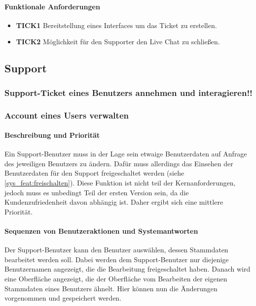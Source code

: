 \paragraph{Funktionale Anforderungen}
\begin{itemize}
\item \textbf{TICK1} Bereitstellung eines Interfaces um das Ticket zu erstellen.
\item \textbf{TICK2} Möglichkeit für den Supporter den Live Chat zu schließen.
\end{itemize}


\subsection{Support}
\subsubsection{Support-Ticket eines Benutzers annehmen und interagieren!!}

\subsubsection{Account eines Users verwalten}
\paragraph{Beschreibung und Priorität}
Ein Support-Benutzer muss in der Lage sein etwaige Benutzerdaten auf Anfrage des jeweiligen Benutzers zu ändern. Dafür muss allerdings das Einsehen der Benutzerdaten für den Support freigeschaltet werden (siehe \ref{sys_feat:freischalten}). Diese Funktion ist nicht teil der Kernanforderungen, jedoch muss es unbedingt Teil der ersten Version sein, da die Kundenzufriedenheit davon abhängig ist. Daher ergibt sich eine mittlere Priorität.
\paragraph{Sequenzen von Benutzeraktionen und Systemantworten}
Der Support-Benutzer kann den Benutzer auswählen, dessen Stammdaten bearbeitet werden soll. Dabei werden dem Support-Benutzer nur diejenige Benutzernamen angezeigt, die die Bearbeitung freigeschaltet haben. Danach wird eine Oberfläche angezeigt, die der Oberfläche vom Bearbeiten der eigenen Stammdaten eines Benutzers ähnelt. Hier können nun die Änderungen vorgenommen und gespeichert werden.
